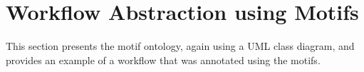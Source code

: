 \section{Workflow Abstraction using Motifs}
This section presents the motif ontology, again using a UML class diagram, and provides an example of a workflow that was annotated using the motifs.
